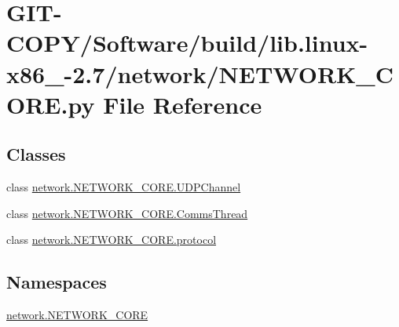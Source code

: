 \hypertarget{GIT-COPY_2Software_2build_2lib_8linux-x86__64-2_87_2network_2NETWORK__CORE_8py}{}\section{G\+I\+T-\/\+C\+O\+P\+Y/\+Software/build/lib.linux-\/x86\+\_-\/2.7/network/\+N\+E\+T\+W\+O\+R\+K\+\_\+\+C\+O\+R\+E.py File Reference}
\label{GIT-COPY_2Software_2build_2lib_8linux-x86__64-2_87_2network_2NETWORK__CORE_8py}
\subsection*{Classes}
\begin{DoxyCompactItemize}
\item 
class \hyperlink{classnetwork_1_1NETWORK__CORE_1_1UDPChannel}{network.\+N\+E\+T\+W\+O\+R\+K\+\_\+\+C\+O\+R\+E.\+U\+D\+P\+Channel}
\item 
class \hyperlink{classnetwork_1_1NETWORK__CORE_1_1CommsThread}{network.\+N\+E\+T\+W\+O\+R\+K\+\_\+\+C\+O\+R\+E.\+Comms\+Thread}
\item 
class \hyperlink{classnetwork_1_1NETWORK__CORE_1_1protocol}{network.\+N\+E\+T\+W\+O\+R\+K\+\_\+\+C\+O\+R\+E.\+protocol}
\end{DoxyCompactItemize}
\subsection*{Namespaces}
\begin{DoxyCompactItemize}
\item 
 \hyperlink{namespacenetwork_1_1NETWORK__CORE}{network.\+N\+E\+T\+W\+O\+R\+K\+\_\+\+C\+O\+R\+E}
\end{DoxyCompactItemize}

